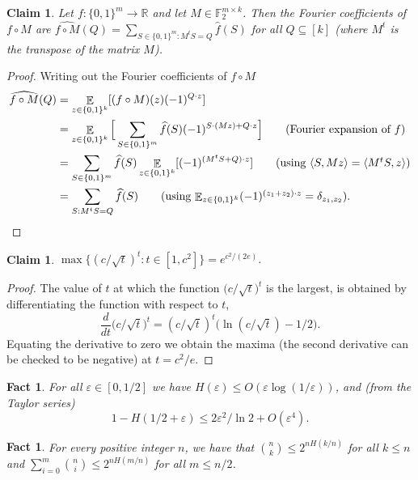 \documentclass[twoside,11pt]{article}
\newcommand{\eps}{\varepsilon}
\newcommand{\F}{\ensuremath{\mathbb{F}}}
\newcommand{\R}{\ensuremath{\mathbb{R}}}
\DeclareMathOperator*{\Ex}{\mathbb{E}}
\newtheorem{claim}[theorem]{Claim}
\newtheorem{fact}[theorem]{Fact}
\def\01{\{0,1\}}
\begin{document}
\begin{claim}
	\label{claim:Fouriercoeffmatrixprod}
	Let $f:\01^m\rightarrow \R$ and let $M\in \F_2^{m\times k}$. Then the Fourier coefficients of $f\circ M$ are $\widehat{f\circ M}(Q)=\sum_{S\in \01^m:M^t S =Q} \widehat{f} (S)$ for all $Q\subseteq [k]$ (where $M^t$ is the transpose of the matrix $M$).  
\end{claim}
\begin{proof}
	Writing out the Fourier coefficients of $f\circ M$
	\begin{align*}
	\widehat{f\circ M}(Q)&= \Ex_{z\in \01^k} [ (f\circ M)(z) (-1)^{Q\cdot z}] \\
	&=\Ex_{z\in \01^k} \Big[\sum_{S\in \01^m} \widehat{f}(S) (-1)^{S\cdot (M z)+Q\cdot z}\Big]  \tag{Fourier expansion of $f$}\\
	&=\sum_{S\in \01^m} \widehat{f}(S) \Ex_{z\in \01^k} [(-1)^{(M^t S+Q)\cdot  z}] \tag{using $\langle S,Mz\rangle =\langle M^t S,z\rangle $} \\
	&=\sum_{S:M^t S =Q} \widehat{f} (S) \tag{using $\Ex_{z\in \01^k} (-1)^{(z_1+z_2)\cdot z}=\delta_{z_1,z_2}$}.
	\end{align*}
\end{proof}
\begin{claim}
	\label{claim:maximizingc/sqrtt}
	$\max \{(c/\sqrt{t})^t: t\in [1,c^2]\}=e^{c^2/(2e)}$.
\end{claim}
\begin{proof}
	The value of $t$ at which the function $\Big(c/\sqrt{t}\Big)^t$ is the largest, is obtained by differentiating the function with respect to $t$,
	$$
	\frac{d}{dt} \Big(c/{\sqrt{t}}\Big)^t= (c/\sqrt{t})^t \Big(\ln (c/\sqrt{t})-1/2\Big).
	$$
	Equating the derivative to zero we obtain the maxima (the second derivative can be checked to be negative) at $t=c^2/e$.
\end{proof}
\begin{fact}
	\label{fact:taylorseriesbinaryentropy}
	For all $\eps \in [0,1/2]$ we have $H(\eps)\leq O(\eps \log (1/\eps))$, and (from the Taylor series) 
	$$
	1-H(1/2+\eps)\leq 2\eps^2/\ln 2+O(\eps^4).
	$$
\end{fact}
\begin{fact}
	\label{fact:binomialupperbound}
	For every positive integer $n$, we have that ${n\choose k}\leq 2^{nH(k/n)}$ for all $k\leq n$  and $\sum_{i=0}^{m}{n\choose i}\leq 2^{nH(m/n)}$ for all $m\leq n/2$. 
\end{fact}
\end{document}
